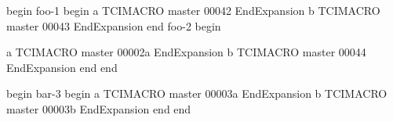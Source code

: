 begin
foo-1
begin
a
TCIMACRO
master 00042
EndExpansion
b
TCIMACRO
master 00043
EndExpansion
end
foo-2
begin

a
TCIMACRO
master 00002a
EndExpansion
b
TCIMACRO
master 00044
EndExpansion
end
end

begin
bar-3
begin
a
TCIMACRO
master 00003a
EndExpansion
b
TCIMACRO
master 00003b
EndExpansion
end
end
